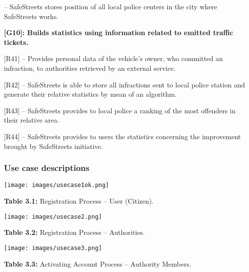 \documentclass[12pt]{article}
\begin{document}
\begin{flushleft}
[R40] – SafeStreets stores position of all local police centers in the city where SafeStreets works. 
\vspace{2mm}

\vspace{4mm}
\textbf{ [G10]: Builds statistics using information related to emitted traffic tickets.}
\vspace{2mm}

[R41] -- Provides personal data of the vehicle’s owner, who committed an infraction, to authorities retrieved by an external service.
\vspace{2mm}

[R42] – SafeStreets is able to store all infractions sent to local police station and generate their relative statistics by mean of an algorithm.
\vspace{2mm}

[R43] – SafeStreets provides to local police a ranking of the most offenders in their relative area.
\vspace{2mm}

[R44] –  SafeStreets provides to users the statistics concerning the improvement brought by SafeStreets initiative.
\vspace{2mm}



\end{flushleft}



\subsubsection{Use case descriptions}
\vspace{5mm}
		 
		 \texttt{[image: images/usecase1ok.png]}                  
		 
		  \textbf{Table 3.1:} Registration Process – User (Citizen).

\newpage
	 
		 \texttt{[image: images/usecase2.png]}                  
		 
		  \textbf{Table 3.2:} Registration Process – Authorities.

\newpage

 \texttt{[image: images/usecase3.png]}                  
		 
		  \textbf{Table 3.3:} Activating Account Process – Authority Members.
		  
\end{document}
